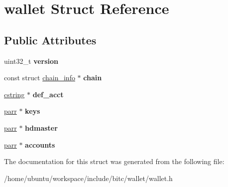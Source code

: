 \hypertarget{structwallet}{\section{wallet Struct Reference}
\label{structwallet}
}
\subsection*{Public Attributes}
\begin{DoxyCompactItemize}
\item 
\hypertarget{structwallet_af39b092e39a02ac56093f3cd2b4bd77c}{uint32\-\_\-t {\bfseries version}}\label{structwallet_af39b092e39a02ac56093f3cd2b4bd77c}

\item 
\hypertarget{structwallet_a786e7406ead1641945016722a1902d51}{const struct \hyperlink{structchain__info}{chain\-\_\-info} $\ast$ {\bfseries chain}}\label{structwallet_a786e7406ead1641945016722a1902d51}

\item 
\hypertarget{structwallet_af5ee1bc91deb9215b328c2aa2e525def}{\hyperlink{structcstring}{cstring} $\ast$ {\bfseries def\-\_\-acct}}\label{structwallet_af5ee1bc91deb9215b328c2aa2e525def}

\item 
\hypertarget{structwallet_aad2f642c895e306b9e2b016d0edc1b36}{\hyperlink{structparr}{parr} $\ast$ {\bfseries keys}}\label{structwallet_aad2f642c895e306b9e2b016d0edc1b36}

\item 
\hypertarget{structwallet_a238b922ee37a94fb851ed2f5555dae34}{\hyperlink{structparr}{parr} $\ast$ {\bfseries hdmaster}}\label{structwallet_a238b922ee37a94fb851ed2f5555dae34}

\item 
\hypertarget{structwallet_a7057f6ad55a63714ef10fbf98f459743}{\hyperlink{structparr}{parr} $\ast$ {\bfseries accounts}}\label{structwallet_a7057f6ad55a63714ef10fbf98f459743}

\end{DoxyCompactItemize}


The documentation for this struct was generated from the following file\-:\begin{DoxyCompactItemize}
\item 
/home/ubuntu/workspace/include/bitc/wallet/wallet.\-h\end{DoxyCompactItemize}
